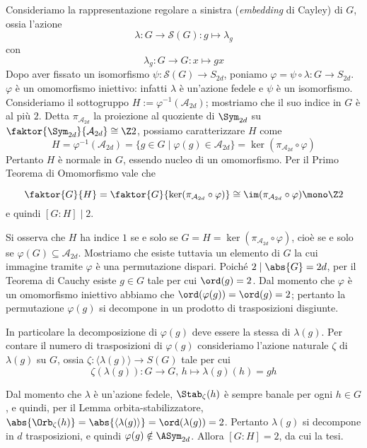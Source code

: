 \documentclass[11pt]{scrartcl}
\begin{document}
	\begin{soln}
		Consideriamo la rappresentazione regolare a sinistra (\textit{embedding} di Cayley) di $G$, ossia l'azione
		\[
		\lambda: G \to \mathcal{S}(G) : g \mapsto \lambda_g
		\]
		con
		\[
		\lambda_g : G \to G : x \mapsto gx
		\]
		Dopo aver fissato un isomorfismo $\psi: \mathcal{S}(G) \to S_{2d}$, poniamo
		$\varphi = \psi \circ \lambda : G \to S_{2d}$. $\varphi$ è 
		un omomorfismo iniettivo: infatti $\lambda$ è un'azione fedele e $\psi$ è
		un isomorfismo. Consideriamo 
		il sottogruppo $H := \varphi^{-1}(\mathcal{A}_{2d})$; mostriamo che il suo 
		indice in $G$ è al più $2$.
		Detta $\pi_{\mathcal{A}_{2d}}$ la proiezione al quoziente di $\Sym_{2d}$ su
		$\faktor{\Sym_{2d}}{\mathcal{A}_{2d}} \cong \Z2$, possiamo caratterizzare $H$ come
		\[
		H = \varphi^{-1}(\mathcal{A}_{2d}) = \{g \in G \mid \varphi(g) \in \mathcal{A}_{2d}\}
		= \ker (\pi_{\mathcal{A}_{2d}}\circ\varphi)
		\]
		Pertanto $H$ è normale in $G$, essendo nucleo di un omomorfismo. 
		Per il Primo Teorema di Omomorfismo vale che
		
		\[ \faktor{G}{H} = \faktor{G}{\ker(\pi_{\mathcal{A}_{2d}}\circ\varphi)} \cong \im(\pi_{\mathcal{A}_{2d}}\circ\varphi) \mono \Z2 \]
		e quindi $[G : H] \mid 2$. \medskip
		

		Si osserva che $H$ ha indice $1$ se e solo se $G = H = \ker(\pi_{\mathcal{A}_{2d}}\circ\varphi)$,
		cioè se e solo se $\varphi(G) \subseteq \mathcal{A}_{2d}$. Mostriamo che esiste
		tuttavia
		un elemento di $G$ la cui immagine tramite $\varphi$ è una permutazione 
		dispari. Poiché $2 \mid \abs{G} = 2d$, per il Teorema di Cauchy esiste
		$g \in G$ tale per cui $\ord(g) = 2$. Dal momento che $\varphi$
		è un omomorfismo iniettivo abbiamo che $\ord(\varphi(g)) = \ord(g) = 2$;
		pertanto la permutazione $\varphi(g)$ si decompone in un prodotto di trasposizioni
		disgiunte.  \medskip
		
		
		In particolare la decomposizione di $\varphi(g)$ deve essere la stessa di
		$\lambda(g)$. Per contare il numero di trasposizioni di $\varphi(g)$
		consideriamo l'azione naturale $\zeta$ di $\lambda(g)$ su $G$, ossia $\zeta : \langle \lambda(g) \rangle \to S(G)$ tale per cui
		\[ \zeta(\lambda(g)) : G \to G, \, h \mapsto \lambda(g)(h) = gh \]
		
	 	Dal momento che $\lambda$ è un'azione fedele, $\Stab_\zeta(h)$ è sempre
		banale per ogni $h \in G$, e quindi, per il Lemma
		orbita-stabilizzatore, $\abs{\Orb_\zeta(h)} = \abs{\langle \lambda(g) \rangle} =
		\ord(\lambda(g)) = 2$. Pertanto $\lambda(g)$ si decompone in $d$ trasposizioni,
		e quindi $\varphi(g) \notin \ASym_{2d}$. Allora
		$[G : H] = 2$, da cui la tesi.
	\end{soln}
	
\end{document}
